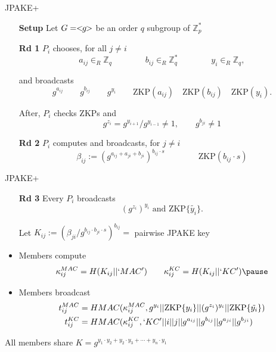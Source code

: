 \documentclass{beamer}
\theoremstyle{definition}
\begin{document}
\begin{frame}{JPAKE+}
    \begin{itemize}
        \item[\textbf{Setup}]  Let $G = <\hspace{-.05in} g \hspace{-.05in} >$ be an order $q$ subgroup of $\mathbb{Z}_p^*$
        \item[] \pause
        \item[\textbf{Rd 1}] $P_i$ chooses, for all $j \neq i$
        \[ a_{ij} \in_R \mathbb{Z}_q \qquad\qquad b_{ij} \in_R \mathbb{Z}_q^* \qquad\qquad y_i \in_R \mathbb{Z}_q, \]
        \item[] and broadcasts
        \[ g^{a_{ij}} \qquad g^{b_{ij}} \qquad g^{y_i} \qquad \text{ZKP}(a_{ij}) \quad \text{ZKP}(b_{ij}) \quad \text{ZKP}(y_{i}). \]
        \item[] After, $P_i$ checks ZKPs and
        \[ g^{z_i} = g^{y_{i+1}}/ g^{y_{i-1}} \neq 1, \qquad g^{b_{ji}} \neq 1\] \pause
        \item[\textbf{Rd 2}]  $P_i$ computes and broadcasts, for $j \neq i$
        \[ \beta_{ij} := \left(g^{a_{ij} + a_{ji} + b_{ji}}\right)^{b_{ij}\cdot s}  \qquad \qquad \text{ZKP}(b_{ij}\cdot s)\]
    \end{itemize}
\end{frame}

\begin{frame}{JPAKE+}
    \begin{itemize}
        \item[\textbf{Rd 3}] Every $P_i$ broadcasts
          \[ (g^{z_i})^{y_i} \text{ and } \text{ZKP}\{\tilde{y_i}\}. \]
        \item[] Let $K_{ij} := (\beta_{ji}/g^{b_{ij} \cdot b_{ji} \cdot s})^{b_{ij}} = $ pairwise JPAKE key \pause
        \item[]
        \item Members compute
          \[ \kappa_{ij}^{MAC} = H(K_{ij} || `MAC') \qquad \kappa_{ij}^{KC} = H(K_{ij} || `KC') \pause \] 
        \item Members broadcast 
        \begin{align*}
        t_{ij}^{MAC} &= HMAC(\kappa_{ij}^{MAC},  g^{y_i} || \text{ZKP}\{y_i\} || (g^{z_i})^{y_i} || \text{ZKP}\{\tilde{y_i}\})\\
        t_{ij}^{KC} &= HMAC(\kappa_{ij}^{KC}, `KC' || i || j || g^{a_{ij}} || g^{b_{ij}} || g^{a_{ji}} || g^{b_{ji}})
        \end{align*}
    \end{itemize}
    
    All members share $K = g^{y_1 \cdot y_2 + y_2 \cdot y_3 + \cdots + y_n \cdot y_1}$
\end{frame}
\end{document}

